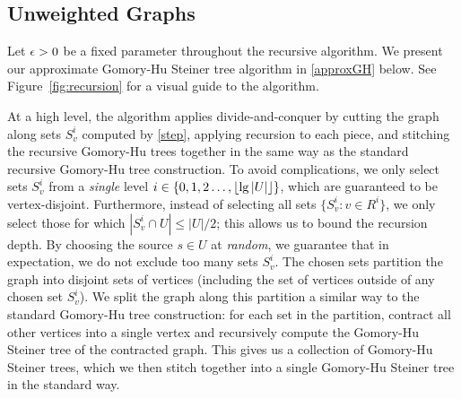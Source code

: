 \subsection{Unweighted Graphs}

Let $\epsilon>0$ be a fixed parameter throughout the recursive algorithm. We present our approximate Gomory-Hu Steiner tree algorithm in \ref{approxGH} below.
See Figure~\ref{fig:recursion} for a visual guide to the algorithm.

At a high level, the algorithm applies divide-and-conquer by cutting the graph along sets $S^i_v$ computed by \ref{step}, applying recursion to each piece, and stitching the recursive Gomory-Hu trees together in the same way as the standard recursive Gomory-Hu tree construction. To avoid complications, we only select sets $S^i_v$ from a \emph{single} level $i\in\{0,1,2\ldots,\lfloor\lg|U|\rfloor\}$, which are guaranteed to be vertex-disjoint. Furthermore, instead of selecting all sets $\{S^i_v:v\in R^i\}$, we only select those for which $|S^i_v\cap U|\le|U|/2$; this allows us to bound the recursion depth. By choosing the source $s\in U$ at \emph{random}, we guarantee that in expectation, we do not exclude too many sets $S^i_v$. The chosen sets partition the graph into disjoint sets of vertices (including the set of vertices outside of any chosen set $S^i_v$). We split the graph along this partition a similar way to the standard Gomory-Hu tree construction: for each set in the partition, contract all other vertices into a single vertex and recursively compute the Gomory-Hu Steiner tree of the contracted graph. This gives us a collection of Gomory-Hu Steiner trees, which we then stitch together into a single Gomory-Hu Steiner tree in the standard way.





